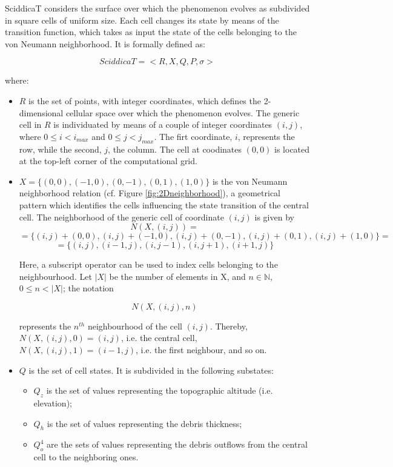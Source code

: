 SciddicaT considers the surface over which the phenomenon evolves as
subdivided in square cells of uniform size. Each cell changes its
state by means of the transition function, which takes as input the
state of the cells belonging to the von Neumann neighborhood. It is
formally defined as:

$$SciddicaT = < R, X, Q , P, \sigma  >$$

where:

\begin{itemize}

\item $R$ is the set of points, with integer coordinates, which
  defines the 2-dimensional cellular space over which the phenomenon
  evolves. The generic cell in $R$ is individuated by means of a
  couple of integer coordinates $(i, j)$, where $0 \leq i < i_{max}$
  and $0 \leq j < j_{max}$. The firt coordinate, $i$, represents the
  row, while the second, $j$, the column. The cell at coodinates
  $(0,0)$ is located at the top-left corner of the computational grid.

\item $X = \{(0,0), (-1, 0), (0, -1), (0, 1), (1, 0)\}$ is the von
  Neumann neighborhood relation (cf. Figure \ref{fig:2Dneighborhood}), a
  geometrical pattern which identifies the cells influencing the state
  transition of the central cell. The neighborhood of the generic cell
  of coordinate $(i, j)$ is given by
$$N(X, (i, j)) =$$
$$= \{(i, j)+(0,0), (i, j)+(-1, 0), (i, j)+(0, -1),
(i, j)+(0, 1), (i, j)+(1, 0)\} =$$
$$= \{(i, j), (i-1, j), (i, j-1), (i, j+1), (i+1, j)\}$$

Here, a subscript operator can be used to index cells belonging to the
neighbourhood. Let $|X|$ be the number of elements in X, and $n \in
\mathbb{N}$, $0 \leq n < |X|$; the notation

$$N(X, (i, j), n)$$

represents the $n^{th}$ neighbourhood of the cell $(i,j)$. Thereby, $N(X, (i, j), 0) = (i, j)$, i.e. the central cell, $N(X, (i, j), 1) = (i-1, j)$, i.e. the first neighbour, and so on. 
  
\item $Q$ is the set of cell states. It is subdivided in the following
  substates:

\begin{itemize}
    \item   $Q_z$ is the set of values representing the topographic altitude (i.e. elevation);
    \item   $Q_h$ is the set of values representing the debris thickness;
    \item   $Q_o^4$ are the sets of values representing the debris outflows from the central cell to the neighboring ones.
\end{itemize}


\end{itemize}
